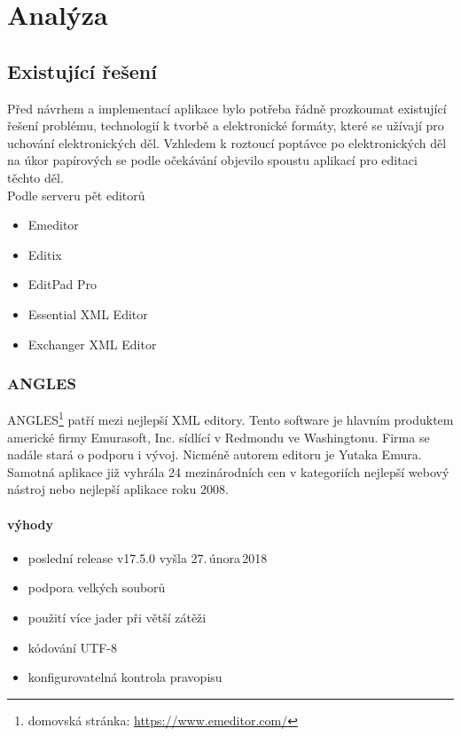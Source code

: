 \chapter{Analýza}

    \section{Existující řešení}
        Před návrhem a implementací aplikace bylo potřeba řádně prozkoumat existující řešení problému, technologií k tvorbě a elektronické formáty, které se užívají pro uchování elektronických děl. Vzhledem k roztoucí poptávce po elektronických děl na úkor papírových se podle očekávání objevilo spoustu aplikací pro editaci těchto děl.\\
        Podle serveru \cite{tei-wiki} pět editorů
        \begin{itemize}
            \item Emeditor
            \item Editix
            \item EditPad Pro
            \item Essential XML Editor 
            \item Exchanger XML Editor
        \end{itemize}

        \subsection{ANGLES}
            ANGLES\footnote{domovská stránka: \url{https://www.emeditor.com/}} patří mezi nejlepší XML editory. Tento software je hlavním produktem americké firmy Emurasoft, Inc. sídlící v Redmondu ve Washingtonu. Firma se nadále stará o podporu i vývoj. Nicméně autorem editoru je Yutaka Emura. Samotná aplikace již vyhrála 24 mezinárodních cen v kategoriích nejlepší webový nástroj nebo nejlepší aplikace roku 2008. 
            
            \subsubsection{výhody}
                \begin{itemize}
                    \item poslední release v17.5.0 vyšla 27.\,února\,2018
                    \item podpora velkých souborů
                    \item použití více jader při větší zátěži
                    \item kódování UTF-8
                    \item konfigurovatelná kontrola pravopisu
                \end{itemize}
                
